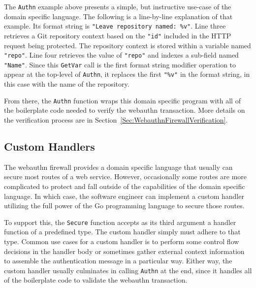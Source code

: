 
The \lstinline{Authn} example above presents a simple, but instructive use-case of the domain specific language. The following is a line-by-line explanation of that example. Its format string is \lstinline{"Leave repository named: %v"}. Line three retrieves a Git repository context based on the \lstinline{"id"} included in the HTTP request being protected. The repository context is stored within a variable named \lstinline{"repo"}. Line four retrieves the value of \lstinline{"repo"} and indexes a sub-field named \lstinline{"Name"}. Since this \lstinline{GetVar} call is the first format string modifier operation to appear at the top-level of \lstinline{Authn}, it replaces the first \lstinline{"%v"} in the format string, in this case with the name of the repository.

From there, the \lstinline{Authn} function wraps this domain specific program with all of the boilerplate code needed to verify the webauthn transaction. More details on the verification process are in Section~\ref{Sec:WebauthnFirewallVerification}.




\subsection{Custom Handlers}\label{Sec:CustomHandlers}



The webauthn firewall provides a domain specific language that usually can secure most routes of a web service. However, occasionally some routes are more complicated to protect and fall outside of the capabilities of the domain specific language. In which case, the software engineer can implement a custom handler utilizing the full power of the Go programming language to secure those routes.

To support this, the \lstinline{Secure} function accepts as its third argument a handler function of a predefined type. The custom handler simply must adhere to that type. Common use cases for a custom handler is to perform some control flow decisions in the handler body or sometimes gather external context information to assemble the authentication message in a particular way. Either way, the custom handler usually culminates in calling \lstinline{Authn} at the end, since it handles all of the boilerplate code to validate the webauthn transaction.

